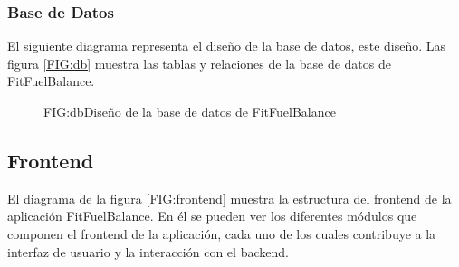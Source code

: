 \subsubsection{Base de Datos}

El siguiente diagrama representa el diseño de la base de datos, este diseño. Las figura \ref{FIG:db} muestra las tablas y relaciones de la base de datos de FitFuelBalance.

\begin{figure}[Diseño de la base de datos]{FIG:db}{Diseño de la base de datos de FitFuelBalance}
\end{figure}

\newpage
\subsection{Frontend}

El diagrama de la figura \ref{FIG:frontend} muestra la estructura del frontend de la aplicación FitFuelBalance. En él se pueden ver los diferentes módulos que componen el frontend de la aplicación, cada uno de los cuales contribuye a la interfaz de usuario y la interacción con el backend.

